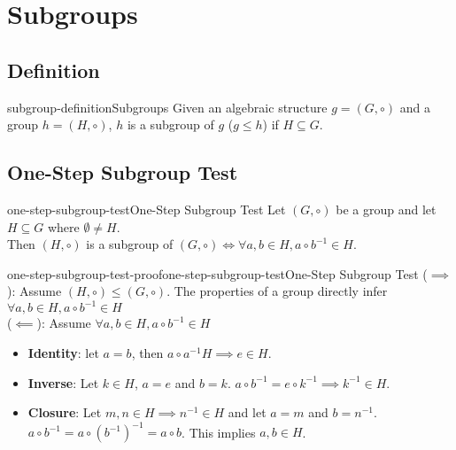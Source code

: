 \documentclass[preview]{standalone}
\begin{document}
\section{Subgroups}

\subsection{Definition}

\begin{snippetdefinition}{subgroup-definition}{Subgroups}
    Given an algebraic structure \(g=(G, \circ)\) and a group \(h=(H, \circ)\), \(h\)
    is a subgroup of \(g\) (\(g \leq h\)) if \(H \subseteq G\).
\end{snippetdefinition}

\subsection{One-Step Subgroup Test}

\begin{snippettheorem}{one-step-subgroup-test}{One-Step Subgroup Test}
    Let \((G, \circ)\) be a group and let \(H \subseteq G\) where \(\emptyset \neq H\).\\
    Then \((H, \circ)\) is a subgroup of \((G, \circ) \iff
    \forall a,b \in H, a \circ b^{-1} \in H\).
\end{snippettheorem}

\begin{snippetproof}{one-step-subgroup-test-proof}{one-step-subgroup-test}{One-Step Subgroup Test}
    (\(\implies\)): Assume \((H, \circ) \leq (G, \circ)\).
    The properties of a group directly infer \(\forall a,b \in H, a \circ b^{-1} \in H\) \\
    (\(\impliedby\)): Assume \(\forall a,b \in H, a \circ b^{-1} \in H\)
    \begin{itemize}
        \item \textbf{Identity}: let \(a=b\), then \(a\circ a^{-1} H \implies e \in H\).
        \item \textbf{Inverse}: Let \(k\in H\), \(a=e\) and \(b=k\).
        \(a\circ b^{-1} = e \circ k^{-1} \implies k^{-1} \in H\).
        \item \textbf{Closure}: Let \(m, n \in H \implies n^{-1} \in H\) and let \(a=m\) and \(b=n^{-1}\).
        \(a\circ b^{-1} = a \circ (b^{-1})^{-1}=a\circ b\). This implies \(a, b \in H\).
    \end{itemize}
\end{snippetproof}
\end{document}
